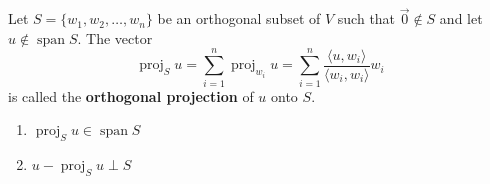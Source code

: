 \begin{definition}
Let $S = \{w_1, w_2, \dots, w_n\}$ be an orthogonal subset of $V$ such that $\vec{0} \notin S$ and let $u \notin \operatorname{span}S$. The vector
$$\operatorname{proj}_Su = \sum_{i=1}^n \operatorname{proj}_{w_i}u = \sum_{i=1}^n \frac{\langle u, w_i\rangle}{\langle w_i, w_i \rangle}w_i$$
is called the \textbf{orthogonal projection} of $u$ onto $S$.
\end{definition}

\begin{remark}
\leavevmode
\begin{enumerate}
    \item $\operatorname{proj}_Su \in \operatorname{span}S$
    \item $u - \operatorname{proj}_Su \perp S$
\end{enumerate}
\end{remark}